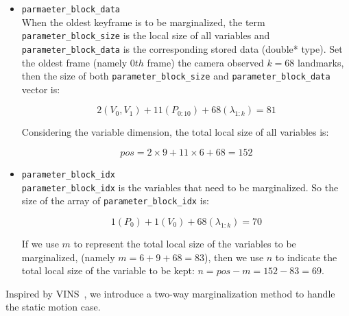 \documentclass[12pt]{report}   %
\newcounter{case}
\begin{document}
\begin{itemize}
	\item \verb|parmaeter_block_data|	\\
	 When the oldest keyframe is to be marginalized, the term \verb|parameter_block_size| is the local size of all variables and  \verb|parameter_block_data| is the corresponding stored data (double* type). 
	Set the oldest frame (namely $0th$ frame) the camera observed $k=68$ landmarks, then the size of both \verb|parameter_block_size| and \verb|parameter_block_data| vector is:
	
	\begin{equation*}
	2(V_0, V_1) + 11(P_{0:10}) + 68(\lambda_{1:k}) = 81
	\end{equation*}
	
	Considering the variable dimension, the total local size of all variables is:
	
	\begin{equation*}
	pos = 2\times 9 + 11\times 6 + 68 = 152
	\end{equation*}
	
	\item \verb|parameter_block_idx| \\
	
	\verb|parameter_block_idx| is the variables that need to be marginalized. So the size of the array of \verb|parameter_block_idx| is:
	
	\begin{equation*}
	1(P_0) + 1(V_0) + 68(\lambda_{1:k}) = 70
	\end{equation*}
	
	If we use $m$ to represent the total local size of the variables to be marginalized, (namely $m=6+9+68=83$), then we use $n$ to indicate the total local size of the variable to be kept: $n=pos-m = 152-83=69$.
	
\end{itemize}


Inspired by VINS~\cite{qin2017vins}, we introduce a two-way marginalization method to handle the static motion case. 
\end{document}
